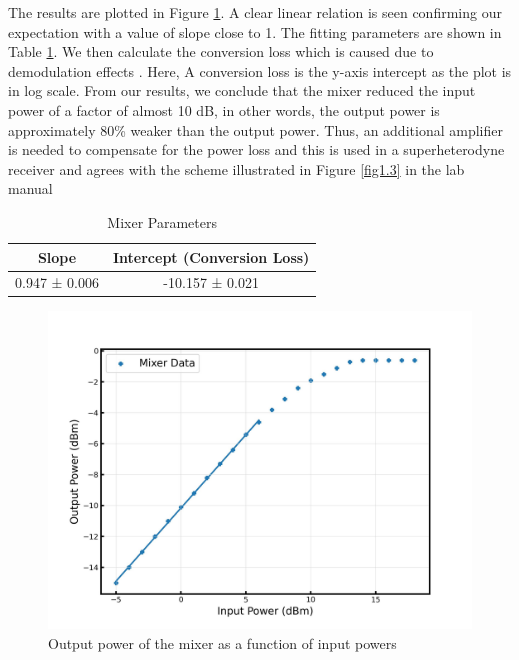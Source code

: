 \documentclass[12pt]{article}
\begin{document}
The results are plotted in Figure \ref{fig1.4}. A clear linear relation is seen confirming our expectation with a value of slope close to 1. The fitting parameters are shown in Table \ref{T5}. We then calculate the conversion loss which is caused due to demodulation effects \cite{mixers}. Here, A conversion loss is the y-axis intercept as the plot is in log scale. From our results, we conclude that the mixer reduced the input power of a factor of almost 10 dB, in other words, the output power is approximately 80\% weaker than the output power. Thus, an additional amplifier is needed to compensate for the power loss and this is used in a superheterodyne receiver and agrees with the scheme illustrated in Figure \ref{fig1.3} in the lab manual \cite{lecturenote}

\begin{table}[H]
    \centering
    \caption{Mixer Parameters}
    \label{T5}
    \begin{tabular}{c |c}
        \hline
        \hline
        Slope & Intercept (Conversion Loss) \\
        \hline
        
         0.947 ± 0.006 & -10.157 ± 0.021\\
        \hline
    \end{tabular}
\end{table}

\begin{figure}[H]
\centering
\includegraphics[scale=.5]{fig/Exercise 1.4.jpg}
\caption{Output power of the mixer as a function of input powers}
\label{fig1.4}
\end{figure}
\end{document}
